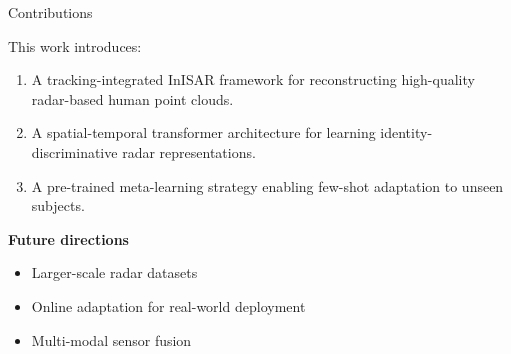 \begin{block}{Contributions}

This work introduces:

\begin{enumerate}

\item
A tracking-integrated InISAR framework for reconstructing
high-quality radar-based human point clouds.

\item
A spatial-temporal transformer architecture for learning
identity-discriminative radar representations.

\item
A pre-trained meta-learning strategy enabling few-shot
adaptation to unseen subjects.

\end{enumerate}


\textbf{Future directions}

\begin{itemize}
    \item Larger-scale radar datasets
    \item Online adaptation for real-world deployment
    \item Multi-modal sensor fusion
\end{itemize}

\end{block}